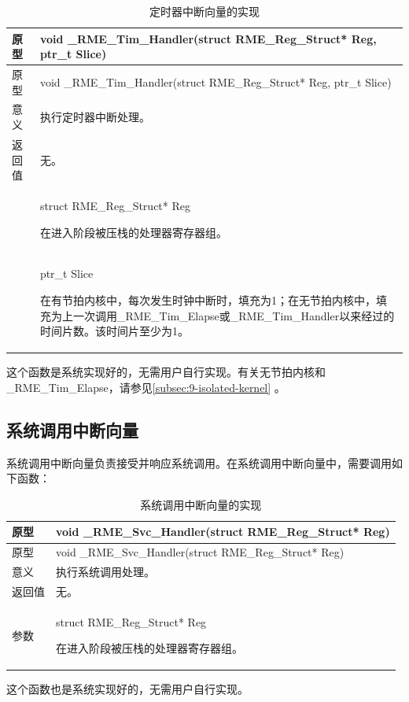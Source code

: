 \begin{xltabular}{\textwidth}{@{}>{\hsize\raggedright\arraybackslash}X>{\hsize\raggedright\arraybackslash}X@{}}
\caption{定时器中断向量的实现}\label{tab:7-19-timer-interrupt-vector-implementation}\\
\toprule
原型 & void \_RME\_Tim\_Handler(struct RME\_Reg\_Struct* Reg, ptr\_t
Slice)\tabularnewline
\endfirsthead
\toprule
原型 & void \_RME\_Tim\_Handler(struct RME\_Reg\_Struct* Reg, ptr\_t
Slice)\tabularnewline
\midrule
\endhead
\bottomrule
\endlastfoot
意义 & 执行定时器中断处理。\tabularnewline
返回值 & 无。\tabularnewline
{} & struct RME\_Reg\_Struct* Reg

在进入阶段被压栈的处理器寄存器组。\strut
\tabularnewline
\strut
 & ptr\_t Slice

在有节拍内核中，每次发生时钟中断时，填充为1；在无节拍内核中，填充为上一次调用\_RME\_Tim\_Elapse或\_RME\_Tim\_Handler以来经过的时间片数。该时间片至少为1。\strut
\tabularnewline
\end{xltabular}

这个函数是系统实现好的，无需用户自行实现。有关无节拍内核和\_RME\_Tim\_Elapse，请参见\ref{subsec:9-isolated-kernel}
。

\subsection{系统调用中断向量}\label{subsec:7-system-call-interrupt-vector}

系统调用中断向量负责接受并响应系统调用。在系统调用中断向量中，需要调用如下函数：

\begin{xltabular}{\textwidth}{@{}>{\hsize\raggedright\arraybackslash}X>{\hsize\raggedright\arraybackslash}X@{}}
\caption{系统调用中断向量的实现}\label{tab:7-20-system-call-interrupt-vector-implementation}\\
\toprule
原型 & void \_RME\_Svc\_Handler(struct RME\_Reg\_Struct*
Reg)\tabularnewline
\endfirsthead
\toprule
原型 & void \_RME\_Svc\_Handler(struct RME\_Reg\_Struct*
Reg)\tabularnewline
\midrule
\endhead
\bottomrule
\endlastfoot
意义 & 执行系统调用处理。\tabularnewline
返回值 & 无。\tabularnewline
参数\strut
 & struct RME\_Reg\_Struct* Reg

在进入阶段被压栈的处理器寄存器组。\strut
\tabularnewline
\end{xltabular}

这个函数也是系统实现好的，无需用户自行实现。

